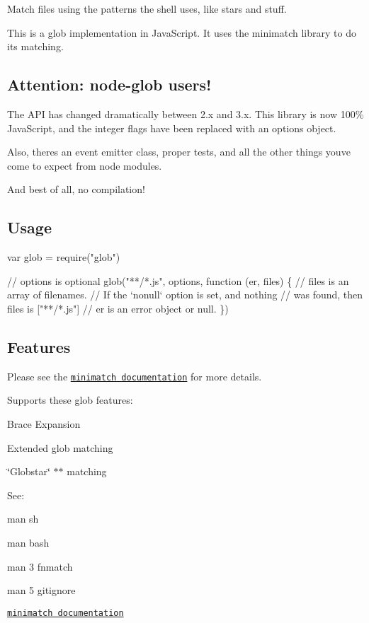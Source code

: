 Match files using the patterns the shell uses, like stars and stuff.

This is a glob implementation in Java\+Script. It uses the {\ttfamily minimatch} library to do its matching.

\subsection*{Attention\+: node-\/glob users!}

The A\+PI has changed dramatically between 2.\+x and 3.\+x. This library is now 100\% Java\+Script, and the integer flags have been replaced with an options object.

Also, there\textquotesingle{}s an event emitter class, proper tests, and all the other things you\textquotesingle{}ve come to expect from node modules.

And best of all, no compilation!

\subsection*{Usage}


\begin{DoxyCode}
var glob = require("glob")

// options is optional
glob("**/*.js", options, function (er, files) \{
  // files is an array of filenames.
  // If the `nonull` option is set, and nothing
  // was found, then files is ["**/*.js"]
  // er is an error object or null.
\})
\end{DoxyCode}


\subsection*{Features}

Please see the \href{https://github.com/isaacs/minimatch}{\tt minimatch documentation} for more details.

Supports these glob features\+:


\begin{DoxyItemize}
\item Brace Expansion
\item Extended glob matching
\item \char`\"{}\+Globstar\char`\"{} {\ttfamily $\ast$$\ast$} matching
\end{DoxyItemize}

See\+:


\begin{DoxyItemize}
\item {\ttfamily man sh}
\item {\ttfamily man bash}
\item {\ttfamily man 3 fnmatch}
\item {\ttfamily man 5 gitignore}
\item \href{https://github.com/isaacs/minimatch}{\tt minimatch documentation}
\end{DoxyItemize}


